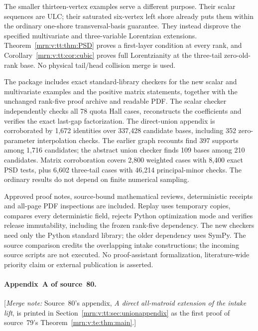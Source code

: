 \documentclass[11pt,a4paper]{article}
\theoremstyle{remark}\newtheorem{remark}[theorem]{Remark}
\newcommand{\mnote}[1]{[\textit{Merge note:} #1]}
\begin{document}
The smaller thirteen-vertex examples serve a different purpose. Their scalar sequences are ULC; their saturated six-vertex left shore already puts them within the ordinary one-shore transversal-basis guarantee. They instead disprove the specified multivariate and three-variable Lorentzian extensions. Theorem~\ref{mrn:v:tt:thm:PSD} proves a first-layer condition at every rank, and Corollary~\ref{mrn:v:tt:cor:cubic} proves full Lorentzianity at the three-tail zero-old-rank base. No physical tail/head collision merge is used.

The package includes exact standard-library checkers for the new scalar and multivariate examples and the positive matrix statements, together with the unchanged rank-five proof archive and readable PDF. The scalar checker independently checks all 78 quota Hall cases, reconstructs the coefficients and verifies the exact last-gap factorization. The direct-union appendix is corroborated by 1,672 identities over 337,428 candidate bases, including 352 zero-parameter interpolation checks. The earlier graph recounts find 397 supports among 1,716 candidates; the abstract union checker finds 109 bases among 210 candidates. Matrix corroboration covers 2,800 weighted cases with 8,400 exact PSD tests, plus 6,602 three-tail cases with 46,214 principal-minor checks. The ordinary results do not depend on finite numerical sampling.

Approved proof notes, source-bound mathematical reviews, deterministic receipts and all-page PDF inspections are included. Replay uses temporary copies, compares every deterministic field, rejects Python optimization mode and verifies release immutability, including the frozen rank-five dependency. The new checkers need only the Python standard library; the older dependency uses SymPy. The source comparison credits the overlapping intake constructions; the incoming source scripts are not executed. No proof-assistant formalization, literature-wide priority claim or external publication is asserted.

\paragraph{Appendix~A of source~80.}
\mnote{Source~80's appendix, \emph{A direct all-matroid extension of the intake
lift}, is printed in Section~\ref{mrn:v:tt:sec:unionappendix} as the first
proof of source~79's Theorem~\ref{mrn:v:te:thm:main}.}

\end{document}
